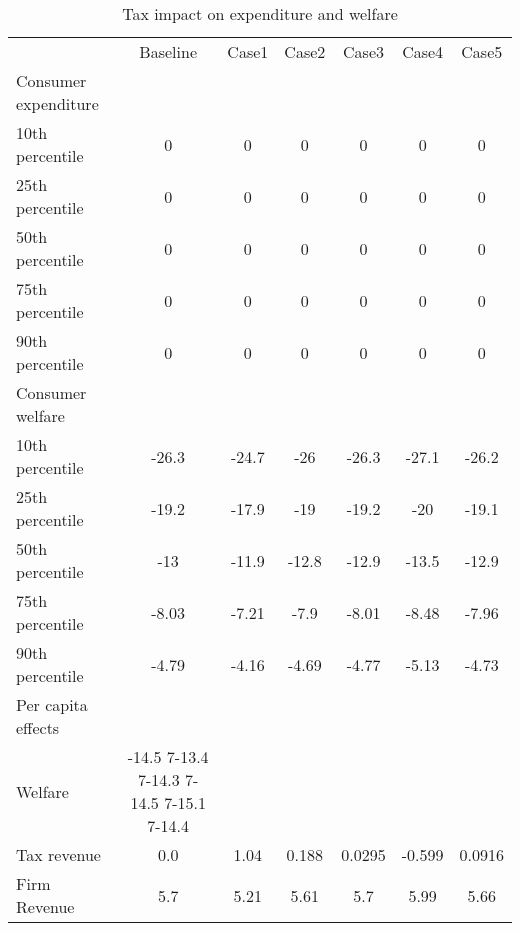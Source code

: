 \documentclass[11pt]{article}
\begin{document}
\begin{table}[h]
\caption{Tax impact on expenditure and welfare}
\label{table:tax impact welfare}
\begin{center}
\begin{tabular}{lcccccc} \hline \hline
 & Baseline & Case1 & Case2 & Case3 & Case4 & Case5 \\
Consumer expenditure & & & & & & \\
10th percentile &0 &0 &0 &0 &0 &0 \\
25th percentile &0 &0 &0 &0 &0 &0 \\
50th percentile &0 &0 &0 &0 &0 &0 \\
75th percentile &0 &0 &0 &0 &0 &0 \\
90th percentile &0 &0 &0 &0 &0 &0 \\
\hline 
Consumer welfare & & & & & & \\
10th percentile &-26.3 &-24.7 &-26 &-26.3 &-27.1 &-26.2 \\
25th percentile &-19.2 &-17.9 &-19 &-19.2 &-20 &-19.1 \\
50th percentile &-13 &-11.9 &-12.8 &-12.9 &-13.5 &-12.9 \\
75th percentile &-8.03 &-7.21 &-7.9 &-8.01 &-8.48 &-7.96 \\
90th percentile &-4.79 &-4.16 &-4.69 &-4.77 &-5.13 &-4.73 \\
\hline 
Per capita effects & & & & & & \\
Welfare & -14.5 7-13.4 7-14.3 7-14.5 7-15.1 7-14.4 \\
Tax revenue & 0.0 &1.04 &0.188 &0.0295 &-0.599 &0.0916 \\
Firm Revenue & 5.7 &5.21 &5.61 &5.7 &5.99 &5.66 \\
 \hline \hline
\end{tabular}
\end{center}
\end{table}
\end{document}
